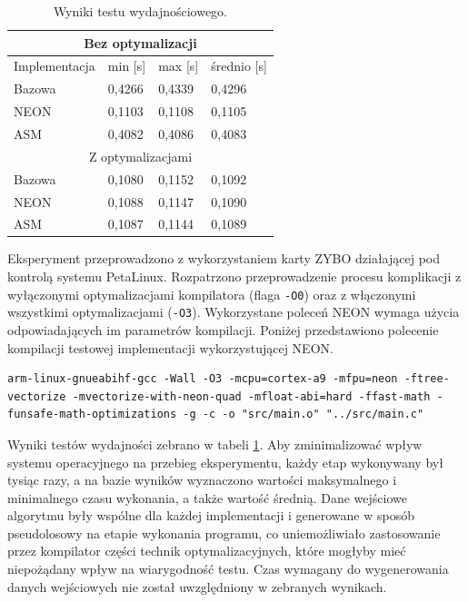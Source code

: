 \begin{table}[h]
	\caption{Wyniki testu wydajnościowego.}
	\centering
	\label{tab:neon-time-results}
	\begin{tabular}{|l|l|l|l|}
		\hline
		\multicolumn{4}{|c|}{Bez optymalizacji} \\ \hline
		Implementacja & min {[}s{]} & max {[}s{]} & średnio {[}s{]} \\ \hline
		Bazowa & 0,4266 & 0,4339 & 0,4296 \\ \hline
		NEON & 0,1103 & 0,1108 & 0,1105 \\ \hline
		ASM & 0,4082 & 0,4086 & 0,4083 \\ \hline
		\multicolumn{4}{|c|}{Z optymalizacjami} \\ \hline
		Bazowa & 0,1080 & 0,1152 & 0,1092 \\ \hline
		NEON & 0,1088 & 0,1147 & 0,1090 \\ \hline
		ASM & 0,1087 & 0,1144 & 0,1089 \\ \hline
	\end{tabular}
\end{table}

Eksperyment przeprowadzono z wykorzystaniem karty ZYBO działającej pod kontrolą systemu PetaLinux.
Rozpatrzono przeprowadzenie procesu komplikacji z wyłączonymi optymalizacjami kompilatora (flaga \texttt{-O0}) oraz z włączonymi wszystkimi optymalizacjami (\texttt{-O3}).
Wykorzystane poleceń NEON wymaga użycia odpowiadających im parametrów kompilacji. 
Poniżej przedstawiono polecenie kompilacji testowej implementacji wykorzystującej NEON.

\begin{lstlisting}[breaklines]
arm-linux-gnueabihf-gcc -Wall -O3 -mcpu=cortex-a9 -mfpu=neon -ftree-vectorize -mvectorize-with-neon-quad -mfloat-abi=hard -ffast-math -funsafe-math-optimizations -g -c -o "src/main.o" "../src/main.c"
\end{lstlisting}

Wyniki testów wydajności zebrano w tabeli \ref{tab:neon-time-results}. Aby zminimalizować wpływ systemu operacyjnego na przebieg eksperymentu, każdy etap wykonywany był tysiąc razy, a na bazie wyników wyznaczono wartości maksymalnego i minimalnego czasu wykonania, a także wartość średnią. Dane wejściowe algorytmu były wspólne dla każdej implementacji i generowane w sposób pseudolosowy na etapie wykonania programu, co uniemożliwiało zastosowanie przez kompilator części technik optymalizacyjnych, które mogłyby mieć niepożądany wpływ na wiarygodność testu. Czas wymagany do wygenerowania danych wejściowych nie został uwzględniony w zebranych wynikach.


